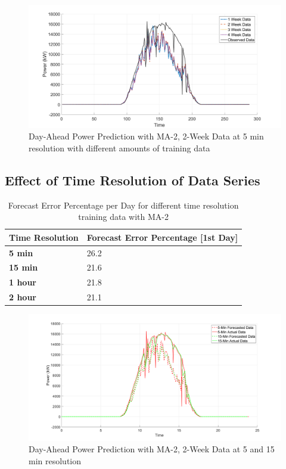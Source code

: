\documentclass[journal]{IEEEtran}
\begin{document}
\begin{figure}[htpb]
	\centering
	\includegraphics[scale=0.2]{Training_length_comparison_plot.png}
	\caption{Day-Ahead Power Prediction with MA-2, 2-Week Data at 5 min resolution with different amounts of training data}
	\label{fig13} %
\end{figure}

\subsection{Effect of Time Resolution of Data Series}


\begin{table}[htpb]
  \centering
  \caption{Forecast Error Percentage per Day for different time resolution training data with MA-2}
\begin{tabular}{|l|l|}
\hline
\textbf{Time Resolution} & \textbf{Forecast Error Percentage {[}1st Day{]}} \\ \hline
\textbf{5 min} & 26.2 \\ \hline
\textbf{15 min} & 21.6 \\ \hline
\textbf{1 hour} & 21.8 \\ \hline
\textbf{2 hour} & 21.1 \\ \hline
\end{tabular}
\label{tab6}
\end{table}

\begin{figure}[htpb]
	\centering
	\includegraphics[scale=0.2]{DiffTimeResolution_5_15_Min.png}
	\caption{Day-Ahead Power Prediction with MA-2, 2-Week Data at 5 and 15 min resolution}
	\label{fig14} %
\end{figure}
\end{document}
